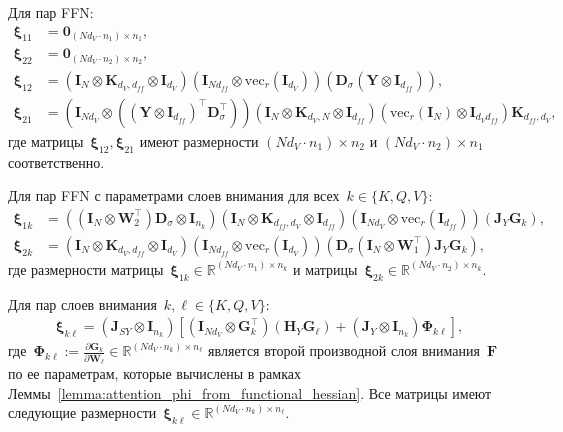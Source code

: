 \begin{theorem}
Для пар FFN:
\begin{align}
    \boldsymbol{\xi}_{11} &= \mathbf{0}_{(N d_V \cdot n_1) \times n_1}, \\
    \boldsymbol{\xi}_{22} &= \mathbf{0}_{(N d_V \cdot n_2) \times n_2}, \\
    \boldsymbol{\xi}_{12} &= \left( \mathbf{I}_{N} \otimes \mathbf{K}_{d_V, d_{ff}} \otimes \mathbf{I}_{d_V} \right) \left( \mathbf{I}_{N d_{ff}} \otimes \mathrm{vec}_r(\mathbf{I}_{d_V}) \right)\left( \mathbf{D}_\sigma  (\mathbf{Y} \otimes \mathbf{I}_{d_{ff}}) \right),\\
    \boldsymbol{\xi}_{21} &= \left( \mathbf{I}_{N d_V} \otimes \left( (\mathbf{Y} \otimes \mathbf{I}_{d_{ff}})^\top \mathbf{D}_\sigma^\top \right) \right)\left( \mathbf{I}_{N} \otimes \mathbf{K}_{d_V, N} \otimes \mathbf{I}_{d_{ff}} \right) \left( \mathrm{vec}_r(\mathbf{I}_{N}) \otimes \mathbf{I}_{d_V d_{ff}} \right) \mathbf{K}_{d_{ff}, d_V},
\end{align}
где матрицы~$\boldsymbol{\xi}_{12},\boldsymbol{\xi}_{21}$ имеют размерности $(N d_V \cdot n_1) \times n_2$ и $(N d_V \cdot n_2) \times n_1$ соответственно.

Для пар FFN с параметрами слоев внимания для всех~$k \in \{K,Q,V\}$:
\begin{align}
    \boldsymbol{\xi}_{1k} &= \left( (\mathbf{I}_{N} \otimes \mathbf{W}_2^\top) \mathbf{D}_\sigma \otimes \mathbf{I}_{n_k}\right)\left( \mathbf{I}_{N} \otimes \mathbf{K}_{d_{ff}, d_V} \otimes \mathbf{I}_{d_{ff}} \right)\left( \mathbf{I}_{N d_V} \otimes \mathrm{vec}_r(\mathbf{I}_{d_{ff}}) \right) \left( \mathbf{J}_Y \mathbf{G}_k \right),\\
    \boldsymbol{\xi}_{2k} &= \left( \mathbf{I}_{N} \otimes \mathbf{K}_{d_V, d_{ff}} \otimes \mathbf{I}_{d_V} \right)\left( \mathbf{I}_{N d_{ff}} \otimes \mathrm{vec}_r(\mathbf{I}_{d_V}) \right)\left( \mathbf{D}_\sigma (\mathbf{I}_{N} \otimes \mathbf{W}_1^\top)  \mathbf{J}_Y \mathbf{G}_k \right),
\end{align}
где размерности матрицы~$\boldsymbol{\xi}_{1k} \in \mathbb{R}^{(N d_V \cdot n_1) \times n_k}$ и матрицы~$\boldsymbol{\xi}_{2k} \in \mathbb{R}^{(N d_V \cdot n_2) \times n_k}$.

Для пар слоев внимания~$k,\ell \in \{K,Q,V\}$:
\begin{align}
    \boldsymbol{\xi}_{k\ell} 
    = \left( \mathbf{J}_{SY} \otimes \mathbf{I}_{n_k} \right)
    \left[\left( \mathbf{I}_{N d_V} \otimes \mathbf{G}_k^\top \right) \left( \mathbf{H}_Y \mathbf{G}_\ell \right)+ \left( \mathbf{J}_Y \otimes \mathbf{I}_{n_k} \right) \boldsymbol{\Phi}_{k\ell}\right],
\end{align}
где~$\boldsymbol{\Phi}_{k\ell} := \frac{\partial \mathbf{G}_k}{\partial \mathbf{W}_\ell} \in \mathbb{R}^{(N d_V \cdot n_k) \times n_\ell}$ является второй производной слоя внимания~$\mathbf{F}$ по ее параметрам, которые вычислены в рамках Леммы~\ref{lemma:attention_phi_from_functional_hessian}. Все матрицы имеют следующие размерности~$\boldsymbol{\xi}_{k\ell} \in \mathbb{R}^{(N d_V \cdot n_k) \times n_\ell}$.


\end{theorem}
